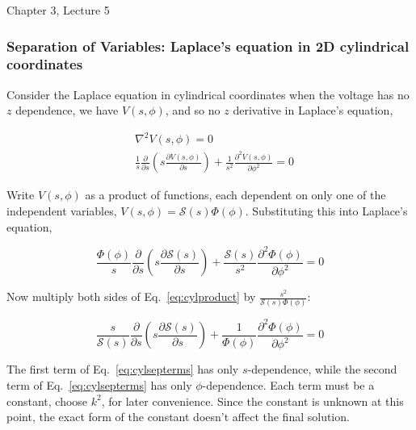 \documentclass[12pt]{article}
\begin{document}
\begin{flushright} {\color{blue} Chapter 3, Lecture 5} \end{flushright}
\begin{flushleft}

\subsubsection*{\color{myblue} \bf Separation of Variables: Laplace's equation in 2D cylindrical coordinates}

Consider the Laplace equation in cylindrical coordinates when the voltage has no $z$ dependence, we have $V(s,\phi)$, and so no $z$ derivative in Laplace's equation,

\begin{equation*}
\begin{aligned}
& \nabla^{2}V(s,\phi) = 0 \\[6pt]
& \frac{1}{s}\frac{\partial}{\partial s}\left( s \frac{\partial V(s,\phi)}{\partial s} \right) + \frac{1}{s^{2}} \frac{\partial^{2} V(s,\phi)}{\partial \phi^{2}}  = 0
\end{aligned}
\end{equation*}

Write $V(s,\phi)$ as a product of functions, each dependent on only one of the independent variables, $V(s,\phi)=\mathcal{S}(s)\Phi(\phi)$.  Substituting this into Laplace's equation,

\begin{equation}
\frac{\Phi(\phi)}{s}\frac{\partial}{\partial s}\left( s \frac{\partial \mathcal{S}(s)}{\partial s} \right) + \frac{\mathcal{S}(s)}{s^{2}} \frac{\partial^{2} \Phi(\phi)}{\partial \phi^{2}}  = 0
\label{eq:cylproduct}
\end{equation}

Now multiply both sides of Eq.~\ref{eq:cylproduct} by $\frac{s^{2}}{\mathcal{S}(s)\Phi(\phi)}$:

\begin{equation}
\frac{s}{\mathcal{S}(s)}\frac{\partial}{\partial s}\left( s \frac{\partial \mathcal{S}(s)}{\partial s} \right) + \frac{1}{\Phi(\phi)} \frac{\partial^{2} \Phi(\phi)}{\partial \phi^{2}}  = 0
\label{eq:cylsepterms}
\end{equation}

The first term of Eq.~\ref{eq:cylsepterms} has only $s$-dependence, while the second term of Eq.~\ref{eq:cylsepterms} has only $\phi$-dependence.  Each term must be a constant, choose $k^{2}$, for later convenience.  Since the constant is unknown at this point, the exact form of the constant doesn't affect the final solution.


\end{flushleft}
\end{document}
